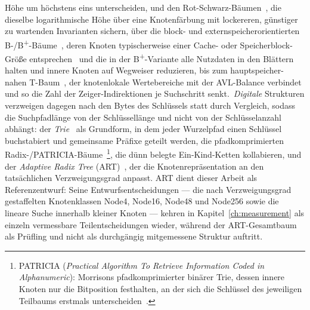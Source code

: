 \begin{nurlang}
Höhe um höchstens eins unterscheiden, und den
Rot-Schwarz-Bäumen~\cite{bayer1972symmetric,guibas1978redblack}, die dieselbe logarithmische Höhe über
eine Knotenfärbung mit lockereren, günstiger zu wartenden Invarianten sichern, über die block- und
externspeicherorientierten B-/B\textsuperscript{+}-Bäume~\cite{bayer1972btree,comer1979btree}, deren
Knoten typischerweise einer Cache- oder Speicherblock-Größe entsprechen~\cite{graefe2001btree,hankins2003nodesize}
und die in der B\textsuperscript{+}-Variante alle Nutzdaten in den Blättern halten und innere Knoten auf
Wegweiser reduzieren,
bis zum hauptspeicher-nahen T-Baum~\cite{lehman1986ttree}, der knotenlokale Wertebereiche mit der
AVL-Balance verbindet und so die Zahl der Zeiger-Indirektionen je Suchschritt senkt.\ \emph{Digitale} Strukturen verzweigen dagegen
nach den Bytes des Schlüssels statt durch Vergleich, sodass die Suchpfadlänge von der Schlüssellänge und
nicht von der Schlüsselanzahl abhängt: der \emph{Trie}~\cite{delabriandais1959trie,fredkin1960trie} als
Grundform, in dem jeder Wurzelpfad einen Schlüssel buchstabiert und gemeinsame Präfixe geteilt werden,
die pfadkomprimierten Radix-/PATRICIA-Bäume~\cite{morrison1968patricia}\footnote{PATRICIA
(\emph{Practical Algorithm To Retrieve Information Coded in Alphanumeric}): Morrisons pfadkomprimierter
binärer Trie, dessen innere Knoten nur die Bitposition festhalten, an der sich die Schlüssel des
jeweiligen Teilbaums erstmals unterscheiden~\cite{morrison1968patricia}.}, die dünn belegte
Ein-Kind-Ketten kollabieren, und der
\emph{Adaptive Radix Tree} (ART)~\cite{leis2013art}, der die Knotenrepräsentation an den tatsächlichen
Verzweigungsgrad anpasst.
ART dient dieser Arbeit als Referenzentwurf: Seine Entwurfsentscheidungen --- die nach Verzweigungsgrad
gestaffelten Knotenklassen Node4, Node16, Node48 und Node256 sowie die lineare Suche innerhalb kleiner
Knoten --- kehren in Kapitel~\ref{ch:measurement} als einzeln vermessbare Teilentscheidungen wieder,
während der ART-Gesamtbaum als Prüfling und nicht als durchgängig mitgemessene Struktur auftritt.
\end{nurlang}
